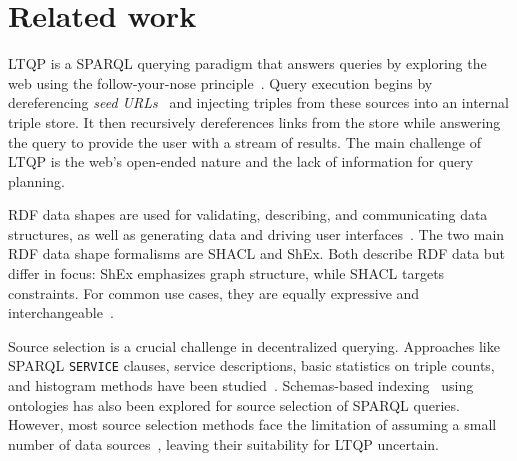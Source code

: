 \section{Related work}

LTQP is a SPARQL querying paradigm that answers queries by exploring the web using the follow-your-nose principle~\cite{hartig2016walking}.
Query execution begins by dereferencing \emph{seed URLs}~\cite{hartig2016walking} and injecting triples from these sources into an internal triple store.
It then recursively dereferences links from the store while answering the query to provide the user with a stream of results.
The main challenge of LTQP is the web's open-ended nature and the lack of information for query planning.

RDF data shapes are used for validating, describing, and communicating data structures, as well as generating data and driving user interfaces~\cite{Gayo2018a,Gayo2018}.
The two main RDF data shape formalisms are SHACL and ShEx.
Both describe RDF data but differ in focus: ShEx emphasizes graph structure, while SHACL targets constraints.
For common use cases, they are equally expressive and interchangeable~\cite{Gayo2018c}.

Source selection is a crucial challenge in decentralized querying.
Approaches like SPARQL \texttt{SERVICE} clauses, service descriptions, basic statistics on triple counts, and histogram methods have been studied~\cite{hose2012towards, Harth2010}.
Schemas-based indexing~\cite{Stuckenschmidt2004} using ontologies has also been explored for source selection of SPARQL queries. 
However, most source selection methods face the limitation of assuming a small number of data sources~\cite{Harth2010}, leaving their suitability for LTQP uncertain.

